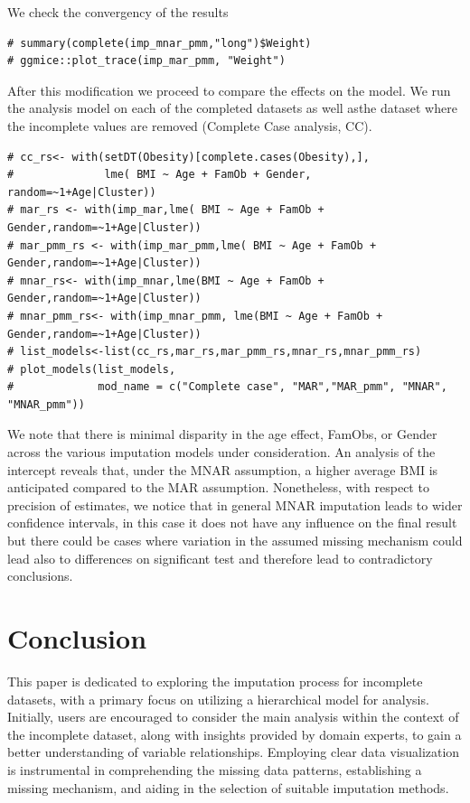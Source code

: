 \documentclass[
  article]{jss}
\begin{document}
We check the convergency of the results

\begin{verbatim}
# summary(complete(imp_mnar_pmm,"long")$Weight)
# ggmice::plot_trace(imp_mar_pmm, "Weight")
\end{verbatim}

After this modification we proceed to compare the effects on the model.
We run the analysis model on each of the completed datasets as well
asthe dataset where the incomplete values are removed (Complete Case
analysis, CC).

\begin{verbatim}
# cc_rs<- with(setDT(Obesity)[complete.cases(Obesity),],
#              lme( BMI ~ Age + FamOb + Gender, random=~1+Age|Cluster))
# mar_rs <- with(imp_mar,lme( BMI ~ Age + FamOb + Gender,random=~1+Age|Cluster))
# mar_pmm_rs <- with(imp_mar_pmm,lme( BMI ~ Age + FamOb + Gender,random=~1+Age|Cluster))
# mnar_rs<- with(imp_mnar,lme(BMI ~ Age + FamOb + Gender,random=~1+Age|Cluster))
# mnar_pmm_rs<- with(imp_mnar_pmm, lme(BMI ~ Age + FamOb + Gender,random=~1+Age|Cluster))
# list_models<-list(cc_rs,mar_rs,mar_pmm_rs,mnar_rs,mnar_pmm_rs)
# plot_models(list_models,
#             mod_name = c("Complete case", "MAR","MAR_pmm", "MNAR", "MNAR_pmm"))
\end{verbatim}

We note that there is minimal disparity in the age effect, FamObs, or
Gender across the various imputation models under consideration. An
analysis of the intercept reveals that, under the MNAR assumption, a
higher average BMI is anticipated compared to the MAR assumption.
Nonetheless, with respect to precision of estimates, we notice that in
general MNAR imputation leads to wider confidence intervals, in this
case it does not have any influence on the final result but there could
be cases where variation in the assumed missing mechanism could lead
also to differences on significant test and therefore lead to
contradictory conclusions.

\hypertarget{conclusion}{%
\section{Conclusion}\label{conclusion}}

This paper is dedicated to exploring the imputation process for
incomplete datasets, with a primary focus on utilizing a hierarchical
model for analysis. Initially, users are encouraged to consider the main
analysis within the context of the incomplete dataset, along with
insights provided by domain experts, to gain a better understanding of
variable relationships. Employing clear data visualization is
instrumental in comprehending the missing data patterns, establishing a
missing mechanism, and aiding in the selection of suitable imputation
methods.
\end{document}
